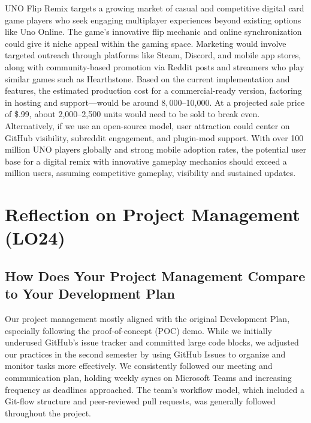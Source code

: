 \documentclass{article}
\begin{document}
UNO Flip Remix targets a growing market of casual and competitive digital card game players who seek engaging multiplayer experiences beyond existing options like Uno Online. The game’s innovative flip mechanic and online synchronization could give it niche appeal within the gaming space. Marketing would involve targeted outreach through platforms like Steam, Discord, and mobile app stores, along with community-based promotion via Reddit posts and streamers who play similar games such as Hearthstone. Based on the current implementation and features, the estimated production cost for a commercial-ready version, factoring in hosting and support—would be around $8,000–$10,000. At a projected sale price of \$\4.99, about 2,000–2,500 units would need to be sold to break even. Alternatively, if we use an open-source model, user attraction could center on GitHub visibility, subreddit engagement, and plugin-mod support. With over 100 million UNO players globally and strong mobile adoption rates, the potential user base for a digital remix with innovative gameplay mechanics should exceed a million users, assuming competitive gameplay, visibility and sustained updates.

\section{Reflection on Project Management (LO24)}


\subsection{How Does Your Project Management Compare to Your Development Plan}

Our project management mostly aligned with the original Development Plan, especially following the proof-of-concept (POC) demo. While we initially underused GitHub’s issue tracker and committed large code blocks, we adjusted our practices in the second semester by using GitHub Issues to organize and monitor tasks more effectively. We consistently followed our meeting and communication plan, holding weekly syncs on Microsoft Teams and increasing frequency as deadlines approached. The team’s workflow model, which included a Git-flow structure and peer-reviewed pull requests, was generally followed throughout the project.
\end{document}
